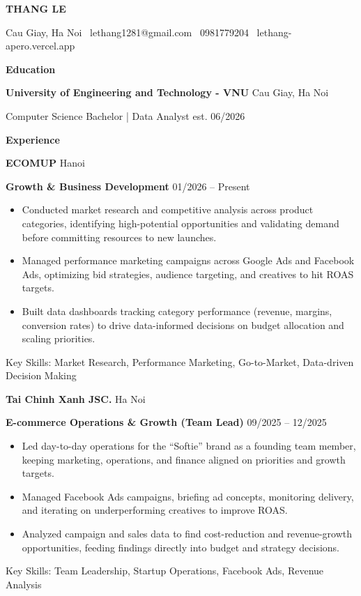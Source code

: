 \documentclass[11pt]{article}
\begin{document}
\begin{center}
    \huge \textbf{THANG LE}\\
    \hrulefill
\end{center}

\begin{center}
    Cau Giay, Ha Noi \textbullet \ lethang1281@gmail.com \textbullet \ 0981779204
    \textbullet \ lethang-apero.vercel.app
\end{center}

\vspace{0.5pt}

\begin{center}
    \textbf{Education}
\end{center}
\textbf{University of Engineering and Technology - VNU} \hfill Cau Giay, Ha Noi

Computer Science Bachelor | Data Analyst \hfill est. 06/2026
\vspace{12pt}

\begin{center}
    \textbf{Experience}
\end{center}
\textbf{ECOMUP} \hfill Hanoi

\textbf{Growth \& Business Development} \hfill 01/2026 -- Present
\begin{itemize}[noitemsep, topsep=0pt, partopsep=0pt, parsep=0pt]
    \item Conducted market research and competitive analysis across product categories, identifying high-potential opportunities and validating demand before committing resources to new launches.
    \item Managed performance marketing campaigns across Google Ads and Facebook Ads, optimizing bid strategies, audience targeting, and creatives to hit ROAS targets.
    \item Built data dashboards tracking category performance (revenue, margins, conversion rates) to drive data-informed decisions on budget allocation and scaling priorities.
\end{itemize}
Key Skills: Market Research, Performance Marketing, Go-to-Market, Data-driven Decision Making

\vspace{12pt}

\textbf{Tai Chinh Xanh JSC.} \hfill Ha Noi

\textbf{E-commerce Operations \& Growth (Team Lead)} \hfill 09/2025 -- 12/2025
\begin{itemize}[noitemsep, topsep=0pt, partopsep=0pt, parsep=0pt]
    \item Led day-to-day operations for the ``Softie'' brand as a founding team member, keeping marketing, operations, and finance aligned on priorities and growth targets.
    \item Managed Facebook Ads campaigns, briefing ad concepts, monitoring delivery, and iterating on underperforming creatives to improve ROAS.
    \item Analyzed campaign and sales data to find cost-reduction and revenue-growth opportunities, feeding findings directly into budget and strategy decisions.
\end{itemize}
Key Skills: Team Leadership, Startup Operations, Facebook Ads, Revenue Analysis
\end{document}
